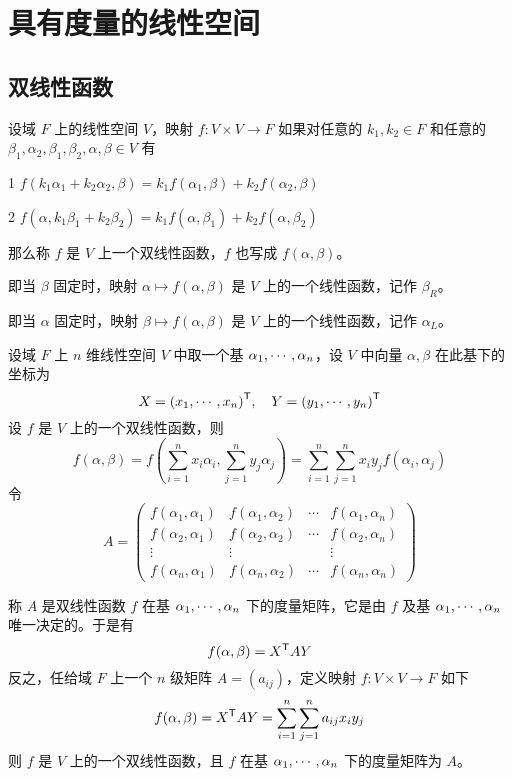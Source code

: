 \chapter{具有度量的线性空间}

\section{双线性函数}

\begin{definition}[双线性函数]
    设域 $F$ 上的线性空间 $V$，映射 $f : V \times V \to F$ 如果对任意的 $k_1,k_2 \in F$ 和任意的 $\beta_1,\alpha_2,\beta_1,\beta_2,\alpha,\beta \in V$ 有

    \num{1} $f(k_1\alpha_1 + k_2\alpha_2,\beta) = k_1 f(\alpha_1,\beta) + k_2f(\alpha_2,\beta)$

    \num{2} $f(\alpha,k_1\beta_1 + k_2\beta_2) = k_1 f(\alpha,\beta_1) + k_2f(\alpha,\beta_2)$

    那么称 $f$ 是 $V$ 上一个双线性函数，$f$ 也写成 $f(\alpha,\beta)$。
\end{definition}

即当 $\beta$ 固定时，映射 $\alpha \mapsto f(\alpha,\beta)$ 是 $V$ 上的一个线性函数，记作 $\beta_R$。

即当 $\alpha$ 固定时，映射 $\beta \mapsto f(\alpha,\beta)$ 是 $V$ 上的一个线性函数，记作 $\alpha_L$。

设域 $F$ 上 $n$ 维线性空间 $V$ 中取一个基 $\alpha_1,\cdots,\alpha_n$，设 $V$ 中向量 $\alpha,\beta$ 在此基下的坐标为
\[ X = {(x_1,\cdots,x_n)}^\mathsf{T}, \quad Y = {(y_1,\cdots,y_n)}^\mathsf{T} \]
设 $f$ 是 $V$ 上的一个双线性函数，则
\[ f(\alpha,\beta) = f\left( \sum_{i=1}^n x_i\alpha_i,\sum_{j=1}^ny_j\alpha_j \right) = \sum_{i=1}^n\sum_{j=1}^n x_iy_jf(\alpha_i,\alpha_j) \]
令
\[ A = \left(\begin{matrix}
    f(\alpha_1,\alpha_1) & f(\alpha_1,\alpha_2) & \cdots & f(\alpha_1,\alpha_n)\\
    f(\alpha_2,\alpha_1) & f(\alpha_2,\alpha_2) & \cdots & f(\alpha_2,\alpha_n)\\
    \vdots                 & \vdots                 &        & \vdots                \\
    f(\alpha_n,\alpha_1) & f(\alpha_n,\alpha_2) & \cdots & f(\alpha_n,\alpha_n)
\end{matrix}\right) \]

称 $A$ 是双线性函数 $f$ 在基 $\alpha_1,\cdots,\alpha_n$ 下的度量矩阵，它是由 $f$ 及基 $\alpha_1,\cdots,\alpha_n$ 唯一决定的。于是有
\[ f(\alpha,\beta) = {X}^\mathsf{T}AY \]
反之，任给域 $F$ 上一个 $n$ 级矩阵 $A = (a_{ij})$，定义映射 $f : V \times V \to F$ 如下
\[ f(\alpha,\beta) = {X}^\mathsf{T}AY = \sum_{i=1}^n\sum_{j=1}^na_{ij}x_iy_j \]
则 $f$ 是 $V$ 上的一个双线性函数，且 $f$ 在基 $\alpha_1,\cdots,\alpha_n$ 下的度量矩阵为 $A$。

